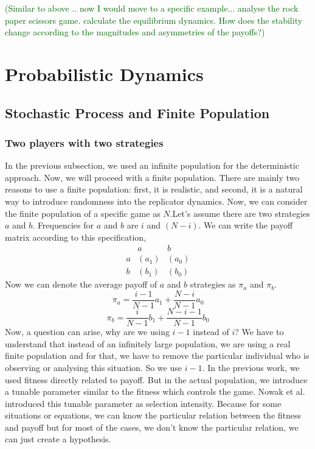 \documentclass{article}
\newcommand{\cha}[1]{\textcolor{darkgreen}{(#1)}}
\begin{document}
\cha{Similar to above .. now I would move to a specific example... analyse the rock paper scissors game. calculate the equilibrium dynamics. How does the stability change according to the magnitudes and asymmetries of the payoffs?}


\section{Probabilistic Dynamics}
\subsection{Stochastic Process and Finite Population}
\subsubsection{Two players with two strategies}
In the previous subsection, we used an infinite population for the deterministic approach\cite{Hofbauer2003}. Now, we will proceed with a finite population. There are mainly two reasons to use a finite population: first, it is realistic, and second, it is a natural way to introduce randomness into the replicator dynamics\cite{Altrock2010}.
Now, we can consider the finite population of a specific game as $N$.Let's assume there are two strategies $a$ and $b$. Frequencies for $a$ and $b$ are $i$ and $(N-i)$. We can write the payoff matrix according to this specification,
\[
\begin{array}{c|cc}
    & a & b \\
    \hline
  a & (a_1) & (a_0) \\
  b & (b_1) & (b_0)
\end{array}
\]
Now we can denote the average payoff of $a$ and $b$ strategies as $\pi_a$ and $\pi_b$.
\[\pi_a=\frac{i-1}{N-1}a_1 + \frac{N-i}{N-1}a_0\]
\[\pi_b=\frac {i}{N-1}b_1 + \frac{N-i-1}{N-1}b_0\]
Now, a question can arise, why are we using $i-1$ instead of $i$? We have to understand that instead of an infinitely large population, we are using a real finite population and for that, we have to remove the particular individual who is observing or analysing this situation. So we use $i-1$.
In the previous work, we used fitness directly related to payoff. But in the actual population, we introduce a tunable parameter similar to the fitness which controls the game.
Nowak et al.\cite{Nowak2004} introduced this tunable parameter as selection intensity. Because for some situations or equations, we can know the particular relation between the fitness and payoff but for most of the cases, we don't know the particular relation, we can just create a hypothesis.
\end{document}
